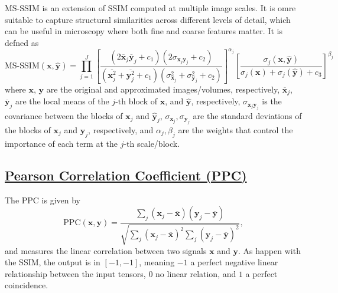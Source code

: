 \documentclass{article}
\begin{document}
MS-SSIM \cite{wang2003multiscale} is an extension of SSIM computed at
multiple image scales. It is omre suitable to capture structural
similarities across different levels of detail, which can be useful in
microscopy where both fine and coarse features matter. It is defned as
\begin{equation}
  \text{MS-SSIM}(\mathbf{x}, \hat{\mathbf{y}}) = \prod_{j=1}^{J} \left[ \frac{(2 \overline{\mathbf{x}}_j \overline{\mathbf{y}}_j + c_1)(2\sigma_{\mathbf{x}_j \mathbf{y}_j} + c_2)}{(\overline{\mathbf{x}_j^2} + \overline{\mathbf{y}_j^2} + c_1)(\sigma^2_{\mathbf{x}_j} + \sigma^2_{\mathbf{y}_j} + c_2)} \right]^{\alpha_j} \left[ \frac{\sigma_j(\mathbf{x}, \hat{\mathbf{y}})}{\sigma_j(\mathbf{x}) + \sigma_j(\hat{\mathbf{y}}) + c_3} \right]^{\beta_j}
\end{equation}
where $\mathbf{x}$, $\mathbf{y}$ are the original and approximated
images/volumes, respectively, $\overline{\mathbf{x}}_j$,
$\overline{\mathbf{y}}_j$ are the local means of the $j\text{-th}$
block of $\mathbf{x}$, and $\hat{\mathbf{y}}$, respectively,
$\sigma_{\mathbf{x}_j \mathbf{y}_j}$ is the covariance between the
blocks of $\mathbf{x}_j$ and $\hat{\mathbf{y}}_j$,
$\sigma_{\mathbf{x}_j}, \sigma_{\mathbf{y}_j}$ are the standard
deviations of the blocks of $\mathbf{x}_j$ and $\mathbf{y}_j$,
respectively, and $\alpha_j, \beta_j$ are the weights that control the
importance of each term at the $j\text{-th}$ scale/block.


\subsection{\href{https://en.wikipedia.org/wiki/Pearson_correlation_coefficient}{Pearson Correlation Coefficient (PPC)}}

The PPC is given
by
\begin{equation}
  \text{PPC}(\mathbf{x}, \mathbf{y}) = \frac{\sum_j(\mathbf{x}_j - \overline{\mathbf{x}})(\mathbf{y}_j - \overline{\mathbf{y}})}{\sqrt{\sum_j (\mathbf{x}_j - \overline{\mathbf{x}})^2 \sum_j (\mathbf{y}_j - \overline{\mathbf{y}})^2}},
\end{equation}
and measures the linear correlation between two signals $\mathbf{x}$
and $\mathbf{y}$.  As happen with the SSIM, the output is in
$[-1, -1]$, meaning $-1$ a perfect negative linear relationship
between the input tensors, $0$ no linear relation, and $1$ a perfect
coincidence.

\end{document}
